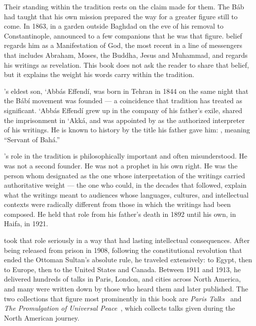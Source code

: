 Their standing within the tradition rests on the claim \Bahaullah made for
them.
The Báb had taught that his own mission prepared the way for a greater
figure still to come.
In 1863, in a garden outside Baghdad on the eve of his removal to
Constantinople, \Bahaullah announced to a few companions that he was that
figure.
\bahai belief regards him as a Manifestation of God, the most recent in a line
of messengers that includes Abraham, Moses, the Buddha, Jesus and Muhammad,
and regards his writings as revelation.
This book does not ask the reader to share that belief, but it explains the
weight his words carry within the tradition.

\Bahaullah's eldest son, `Abbás Effendí, was born in Tehran in 1844 on the
same night that the Bábí movement was founded --- a coincidence that \bahai
tradition has treated as significant.
`Abbás Effendí grew up in the company of his father's exile, shared the
imprisonment in `Akká, and was appointed by \Bahaullah as the authorized
interpreter of his writings.
He is known to history by the title his father gave him: \AbdulBaha,
meaning ``Servant of Bahá.''

\AbdulBaha's role in the tradition is philosophically important and
often misunderstood.
He was not a second founder.
He was not a prophet in his own right.
He was the person whom \Bahaullah designated as the one whose
interpretation of the writings carried authoritative weight --- the one
who could, in the decades that followed, explain what the writings meant
to audiences whose languages, cultures, and intellectual contexts were
radically different from those in which the writings had been composed.
He held that role from his father's death in 1892 until his own, in Haifa,
in 1921.

\AbdulBaha took that role seriously in a way that had lasting intellectual
consequences.
After being released from prison in 1908, following the constitutional
revolution that ended the Ottoman Sultan's absolute rule, he traveled
extensively: to Egypt, then to Europe, then to the United States and Canada.
Between 1911 and 1913, he delivered hundreds of talks in Paris, London, and
cities across North America, and many were written down by those who heard
them and later published.
The two collections that figure most prominently in this book are
\textit{Paris Talks}~\citeyearpar{ParisTalks} and
\textit{The Promulgation of Universal Peace}~\citeyearpar{PUP}, which
collects talks given during the North American journey.


